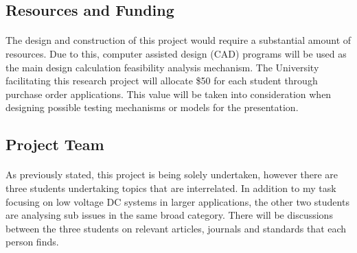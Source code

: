 
\subsection{Resources and Funding}

\paragraph{}
The design and construction of this project would require a substantial amount of resources. Due to this, computer assisted design (CAD) programs will be used as the main design calculation feasibility analysis mechanism. The University facilitating this research project will allocate \$50 for each student through purchase order applications. This value will be taken into consideration when designing possible testing mechanisms or models for the presentation. 


\subsection{Project Team}

\paragraph{}
As previously stated, this project is being solely undertaken, however there are three students undertaking topics that are interrelated. In addition to my task focusing on low voltage DC systems in larger applications, the other two students are analysing sub issues in the same broad category. There will be discussions between the three students on relevant articles, journals and standards that each person finds.
